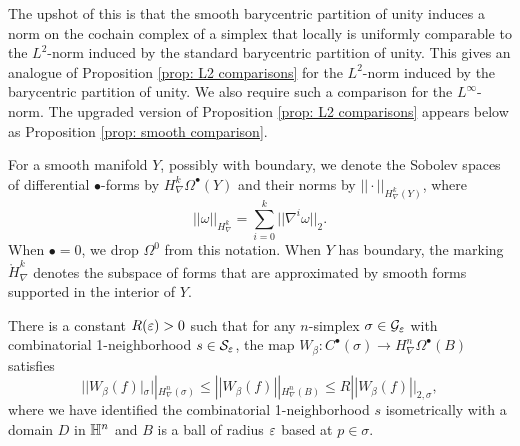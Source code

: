 The upshot of this is that the smooth barycentric partition of unity induces a norm on the cochain complex of a simplex that locally is uniformly comparable to the $L^2$-norm induced by the standard barycentric partition of unity.  This gives an analogue of Proposition \ref{prop: L2 comparisons} for the $L^2$-norm induced by the barycentric partition of unity. We also require such a comparison for the $L^{\infty}$-norm. The upgraded version of Proposition \ref{prop: L2 comparisons} appears below as Proposition \ref{prop: smooth comparison}.

For a smooth manifold $Y$, possibly with boundary, we denote the Sobolev spaces of differential $\bullet$-forms by $H^k_{\nabla}\Omega^{\bullet}(Y)$ and their norms by $||\cdot||_{H^k_{\nabla}(Y)}$, where $$||\omega||_{H^k_{\nabla}} = \sum\limits_{i=0}^k||\nabla^i \omega||_2.$$ When $\bullet = 0$, we drop $\Omega^0$ from this notation.
When $Y$ has boundary, the marking $\mathring{H}^k_{\nabla}$ denotes the subspace of forms that are approximated by smooth forms supported in the interior of $Y$.

\begin{lem} \label{lem: constant R}
    There is a constant $R(\varepsilon)>0$ such that for any $n$-simplex $\sigma\in \mathcal G_\varepsilon$ with combinatorial 1-neighborhood $s\in\mathcal S_\varepsilon$, the map $W_{\beta}:C^{\bullet}(\sigma)\to H^{n}_{\nabla}\Omega^{\bullet}(B)$ satisfies
    $$||W_{\beta}(f)|_{\sigma}||_{H^n_{\nabla}(\sigma)} \leq ||W_{\beta}(f)||_{H^n_{\nabla}(B)} \leq R||W_{\beta}(f)||_{2,\sigma},$$ where we have identified the combinatorial 1-neighborhood $s$ isometrically with a domain $D$ in $\mathbb H^n$ and $B$ is a ball of radius $\varepsilon$ based at $p\in \sigma$.
\end{lem}

